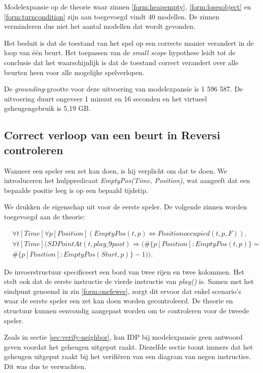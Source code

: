 Modelexpansie op de theorie waar zinnen \ref{form:heapempty}, \ref{form:losesobject} en \ref{form:turncondition} zijn aan toegevoegd vindt 40 modellen. De zinnen verminderen dus niet het aantal modellen dat wordt gevonden.

Het besluit is dat de toestand van het spel op een correcte manier verandert in de loop van \'e\'en beurt. Het toepassen van de \textit{small scope} hypothese leidt tot de conclusie dat het waarschijnlijk is dat de toestand correct verandert over alle beurten heen voor alle mogelijke spelverlopen.

De \textit{grounding}-grootte voor deze uitvoering van modelexpansie is 1 596 587. De uitvoering duurt ongeveer 1 minuut en 16 seconden en het virtueel geheugengebruik is 5,19 GB.

\subsection{Correct verloop van een beurt in Reversi controleren}

Wanneer een speler een zet kan doen, is hij verplicht om dat te doen. We introduceren het hulppredicaat \textit{EmptyPos(Time, Position)}, wat aangeeft dat een bepaalde positie leeg is op een bepaald tijdstip.

We drukken de eigenschap uit voor de eerste speler. De volgende zinnen worden toegevoegd aan de theorie:

\begin{align}
	&\forall{t}[Time]\forall{p}[Position](EmptyPos(t, p) \Leftrightarrow Positionoccupied(t, p, F)).\label{form:emptypos} \\
	\nonumber &\forall{t}[Time](SDPointAt(t, play\_9post) \Rightarrow (\#\{p [Position] : EmptyPos(t, p)\} = \\ &\#\{p [Position] : EmptyPos(Start, p)\} - 1)).\label{form:onefewer}
\end{align}

De invoerstructuur specificeert een bord van twee rijen en twee kolommen. Het stelt ook dat de eerste instructie de vierde instructie van \textit{play()} is. Samen met het eindpunt genoemd in zin \ref{form:onefewer}, zorgt dit ervoor dat enkel scenario's waar de eerste speler een zet kan doen worden gecontroleerd. De theorie en structuur kunnen eenvoudig aangepast worden om te controleren voor de tweede speler.

Zoals in sectie \ref{sec:verify-neighbor}, kan IDP bij modelexpansie geen antwoord geven voordat het geheugen uitgeput raakt. Diezelfde sectie toont immers dat het geheugen uitgeput raakt bij het verifi\"eren van een diagram van negen instructies. Dit was dus te verwachten.


